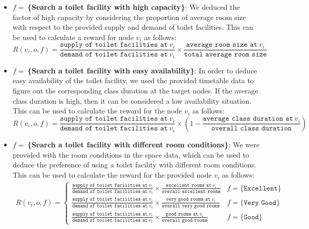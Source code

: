 \begin{itemize}
    \item \textbf{$f=\:$\{Search a toilet facility with high capacity\}}: We deduced the factor of high capacity by considering the proportion of average room size with respect to the provided supply and demand of toilet facilities. This can be used to calculate a reward for node $v_i$ as follows:
    \begin{equation}
    R(v_i,o,f) = \frac{\texttt{supply of toilet facilities at}\:v_i}{\texttt{demand of toilet facilities at}\:v_i} \times \frac{\texttt{average room size at}\:v_i}{\texttt{total average room size}}
     \end{equation}
     
     \item \textbf{$f=\:$\{Search a toilet facility with easy availability\}}: In order to deduce easy availability of the toilet facility, we used the provided timetable data to figure out the corresponding class duration at the target nodes. If the average class duration is high, then it can be considered a low availability situation. This can be used to calculate the reward for the node $v_i$ as follows:
     \begin{equation}
         R(v_i,o,f) = \frac{\texttt{supply of toilet facilities at}\:v_i}{\texttt{demand of toilet facilities at}\:v_i} \times \left(1-\frac{\texttt{average class duration at}\:v_i}{\texttt{overall class duration}}\right)
     \end{equation}
     
     \item \textbf{$f=\:$\{Search a toilet facility with different room conditions\}}: We were provided with the room conditions in the space data, which can be used to deduce the preference of using a toilet facility with different room conditions. This can be used to calculate the reward for the provided node $v_i$ as follows:
     \begin{gather}
         R(v_i,o,f) = \begin{cases}\frac{\texttt{supply of toilet facilities at}\:v_i}{\texttt{demand of toilet facilities at}\:v_i} \times \frac{\texttt{excellent rooms at}\:v_i}{\texttt{overall excellent rooms}} & f=\{\texttt{Excellent}\} \\
         \frac{\texttt{supply of toilet facilities at}\:v_i}{\texttt{demand of toilet facilities at}\:v_i} \times \frac{\texttt{very good rooms at}\:v_i}{\texttt{overall very good rooms}} & f=\{\texttt{Very Good}\} \\
        \frac{\texttt{supply of toilet facilities at}\:v_i}{\texttt{demand of toilet facilities at}\:v_i} \times \frac{\texttt{good rooms at}\:v_i}{\texttt{overall good rooms}} & f=\{\texttt{Good}\}
        \end{cases}
     \end{gather}
    
\end{itemize}


